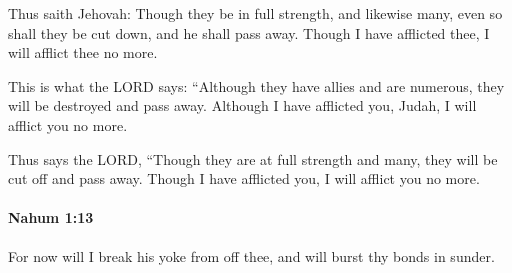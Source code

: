 			\begin{versebox}
					\item[BHS] 
					\item[LXX] 
					\item[ASV] Thus saith Jehovah: Though they be in full strength, and likewise many, even so shall they be cut down, and he shall pass away. Though I have afflicted thee, I will afflict thee no more.
					\item[NIV] This is what the LORD says: “Although they have allies and are numerous, they will be destroyed and pass away. Although I have afflicted you, Judah, I will afflict you no more.
					\item[NRSV] Thus says the LORD, “Though they are at full strength and many, they will be cut off and pass away. Though I have afflicted you, I will afflict you no more.
			\end{versebox}

		\paragraph{Nahum 1:13} %
			\label{NAHUM-1-13}

			For now will I break his yoke from off thee, and will burst thy bonds in sunder.

